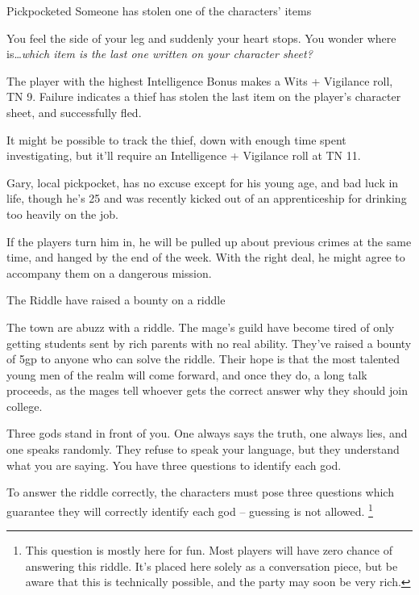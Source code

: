 \begin{multicols}{2}
{Pickpocketed}%
{Someone has stolen one of the characters' items}%

\begin{boxtext}

	You feel the side of your leg and suddenly your heart stops.
	You wonder where is\ldots \textit{which item is the last one written on your character sheet?}

\end{boxtext}

The player with the highest Intelligence Bonus makes a Wits + Vigilance roll, TN 9.
Failure indicates a thief has stolen the last item on the player's character sheet, and successfully fled.

It might be possible to track the thief, down with enough time spent investigating, but it'll require an Intelligence + Vigilance roll at TN 11.

Gary, local pickpocket, has no excuse except for his young age, and bad luck in life, though he's 25 and was recently kicked out of an apprenticeship for drinking too heavily on the job.

If the players turn him in, he will be pulled up about previous crimes at the same time, and hanged by the end of the week.
With the right deal, he might agree to accompany them on a dangerous mission.


{The Riddle}%
{ have raised a bounty on a riddle}%

The town are abuzz with a riddle.  The mage's guild have become tired of only getting students sent by rich parents with no real ability.  They've raised a bounty of 5gp to anyone who can solve the riddle.  Their hope is that the most talented young men of the realm will come forward, and once they do, a long talk proceeds, as the mages tell whoever gets the correct answer why they should join \gls{college}.

\begin{boxtext}
Three gods stand in front of you.  One always says the truth, one always lies, and one speaks randomly.  They refuse to speak your language, but they understand what you are saying.  You have three questions to identify each god.
\end{boxtext}

To answer the riddle correctly, the characters must pose three questions which guarantee they will correctly identify each god -- guessing is not allowed.
\footnote{This question is mostly here for fun.  Most players will have zero chance of answering this riddle.
It's placed here solely as a conversation piece, but be aware that this is technically possible, and the party may soon be very rich.}


\end{multicols}

